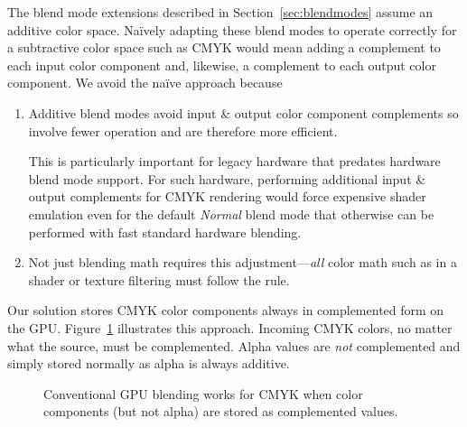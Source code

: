 The blend mode extensions described in Section~\ref{sec:blendmodes}
assume an additive color space.  Na\"{i}vely
adapting these blend modes to operate
correctly for a subtractive color space such as CMYK would mean adding
a complement to each input color component and, likewise, a complement
to each output color component.  We avoid the na\"{i}ve approach because
\begin{enumerate}

\item Additive blend modes avoid input \& output color component
complements so involve fewer operation
and are therefore more efficient.

This is particularly important for legacy hardware that predates
hardware blend mode support.
For such hardware, performing additional input \& output complements for
CMYK rendering would force expensive shader emulation
even for the default {\em Normal} blend mode that otherwise
can be performed with fast standard hardware blending.

\item Not just blending math
requires this adjustment---{\em all} color math such as in a shader or texture filtering must follow the rule.

\end{enumerate}
Our solution stores CMYK color components always in complemented form on the GPU.
Figure~\ref{fig:cmyk-gpu-blending} illustrates this approach.  Incoming CMYK colors, no matter what the source, must be
complemented.  Alpha values are {\em not} complemented and simply stored normally as alpha is always additive.

\begin{figure}[tb]
  \caption{\label{fig:cmyk-gpu-blending} Conventional GPU blending works for CMYK when color components (but not alpha) are stored as complemented values.}
\end{figure}

